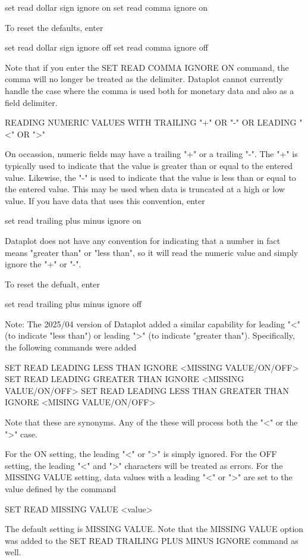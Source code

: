     set read dollar sign ignore on
    set read comma ignore on

To reset the defaults, enter

    set read dollar sign ignore off
    set read comma ignore off

Note that if you enter the SET READ COMMA IGNORE ON command, the
comma will no longer be treated as the delimiter.  Dataplot cannot
currently handle the case where the comma is used both for monetary
data and also as a field delimiter.

READING NUMERIC VALUES WITH TRAILING "+" OR "-" OR LEADING "<" OR ">"

On occassion, numeric fields may have a trailing "+" or a
trailing "-".  The "+" is typically used to indicate that the
value is greater than or equal to the entered value.  Likewise, the
"-" is used to indicate that the value is less than or equal to the
entered value.  This may be used when data is truncated at a high
or low value.  If you have data that uses this convention, enter

    set read trailing plus minus ignore on

Dataplot does not have any convention for indicating that a number
in fact means "greater than" or "less than", so it will read the
numeric value and simply ignore the "+" or "-".

To reset the defualt, enter

    set read trailing plus minus ignore off

Note: The 2025/04 version of Dataplot added a similar capability for
leading "<" (to indicate "less than") or leading ">" (to indicate
"greater than").  Specifically, the following commands were added

    SET READ LEADING LESS THAN IGNORE <MISSING VALUE/ON/OFF>
    SET READ LEADING GREATER THAN IGNORE <MISSING VALUE/ON/OFF>
    SET READ LEADING LESS THAN GREATER THAN IGNORE <MISING VALUE/ON/OFF>

Note that these are synonyms.  Any of the these will process both the
"<" or the ">" case.

For the ON setting, the leading "<" or ">" is simply ignored.  For the
OFF setting, the leading "<" and ">" characters will be treated as errors.
For the MISSING VALUE setting, data values with a leading "<" or ">" are
set to the value defined by the command

        SET READ MISSING VALUE <value>

The default setting is MISSING VALUE.  Note that the MISSING VALUE option
was added to the SET READ TRAILING PLUS MINUS IGNORE command as well.

